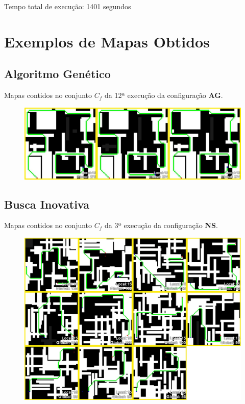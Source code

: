 Tempo total de execução: 1401 segundos

\chapter{Exemplos de Mapas Obtidos}
\label{exemplos_mapas}

\section{Algoritmo Genético}

Mapas contidos no conjunto $C_f$ da 12ª execução da configuração \textbf{AG}.

\begin{figure}[htb]
	\begin{center}
		\includegraphics[width=1\textwidth]{Imagens/maps_ag.jpg}
	\end{center}
\end{figure}

\FloatBarrier
\pagebreak

\section{Busca Inovativa}

Mapas contidos no conjunto $C_f$ da 3ª execução da configuração \textbf{NS}.

\begin{figure}[htb]
	\begin{center}
		\includegraphics[width=1\textwidth]{Imagens/maps_ns.jpg}
	\end{center}
\end{figure}

